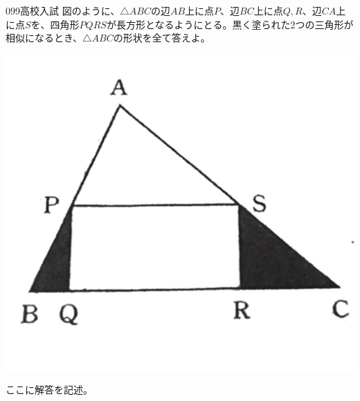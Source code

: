\begin{thm}{099}{}{高校入試}
 図のように、$\triangle{ABC}$の辺$AB$上に点$P$、辺$BC$上に点$Q, R$、辺$CA$上に点$S$を、四角形$PQRS$が長方形となるようにとる。黒く塗られた2つの三角形が相似になるとき、$\triangle{ABC}$の形状を全て答えよ。
 \begin{center}
  \includegraphics[bb=0 0 1200 1088,width=0.7\linewidth]{../problems/Q_099/Q_099.jpg}
 \end{center}
\end{thm}

ここに解答を記述。